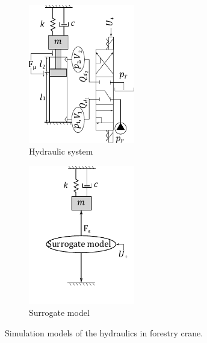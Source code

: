 \begin{figure}[h]
    \begin{subfigure}{0.5\textwidth} 
        \centering
        \includegraphics[width=1.82in]{Fig06a.pdf}
        \caption{Hydraulic system}
        \label{LiftSurrogate}
    \end{subfigure}%
    \hfill
    \begin{subfigure}{0.5\textwidth} 
        \centering
        \includegraphics[width=1.82in]{Fig06b.pdf}
        \caption{Surrogate model}
        \label{TiltSurrogate}
    \end{subfigure}
    \caption{Simulation models of the hydraulics in forestry crane.}
    \label{SurrogateForestry}
\end{figure}

